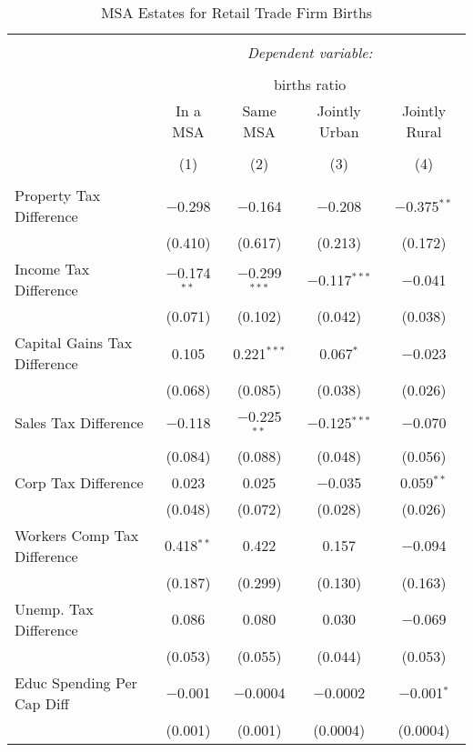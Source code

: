 
\begin{table}[!htbp] \centering 
  \caption{MSA Estates for  Retail Trade Firm Births} 
  \label{44-45metro} 
\begin{tabular}{@{\extracolsep{5pt}}lcccc} 
\\[-1.8ex]\hline 
\hline \\[-1.8ex] 
 & \multicolumn{4}{c}{\textit{Dependent variable:}} \\ 
\cline{2-5} 
\\[-1.8ex] & \multicolumn{4}{c}{births ratio} \\ 
 & In a MSA & Same MSA & Jointly Urban & Jointly Rural \\ 
\\[-1.8ex] & (1) & (2) & (3) & (4)\\ 
\hline \\[-1.8ex] 
 Property Tax Difference & $-$0.298 & $-$0.164 & $-$0.208 & $-$0.375$^{**}$ \\ 
  & (0.410) & (0.617) & (0.213) & (0.172) \\ 
  Income Tax Difference & $-$0.174$^{**}$ & $-$0.299$^{***}$ & $-$0.117$^{***}$ & $-$0.041 \\ 
  & (0.071) & (0.102) & (0.042) & (0.038) \\ 
  Capital Gains Tax Difference & 0.105 & 0.221$^{***}$ & 0.067$^{*}$ & $-$0.023 \\ 
  & (0.068) & (0.085) & (0.038) & (0.026) \\ 
  Sales Tax Difference & $-$0.118 & $-$0.225$^{**}$ & $-$0.125$^{***}$ & $-$0.070 \\ 
  & (0.084) & (0.088) & (0.048) & (0.056) \\ 
  Corp Tax Difference & 0.023 & 0.025 & $-$0.035 & 0.059$^{**}$ \\ 
  & (0.048) & (0.072) & (0.028) & (0.026) \\ 
  Workers Comp Tax Difference & 0.418$^{**}$ & 0.422 & 0.157 & $-$0.094 \\ 
  & (0.187) & (0.299) & (0.130) & (0.163) \\ 
  Unemp. Tax Difference & 0.086 & 0.080 & 0.030 & $-$0.069 \\ 
  & (0.053) & (0.055) & (0.044) & (0.053) \\ 
  Educ Spending Per Cap Diff & $-$0.001 & $-$0.0004 & $-$0.0002 & $-$0.001$^{*}$ \\ 
  & (0.001) & (0.001) & (0.0004) & (0.0004) \\ 

\end{tabular}
\end{table}
